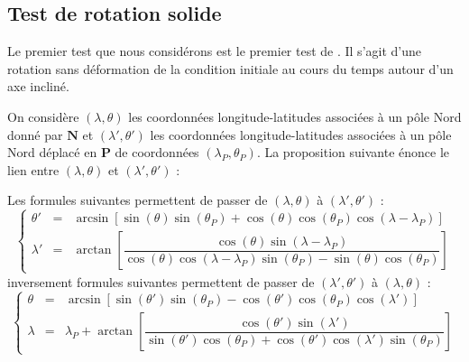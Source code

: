 \subsection{Test de rotation solide}

Le premier test que nous considérons est le premier test de \cite{Williamson1992}. Il s'agit d'une rotation sans déformation de la condition initiale au cours du temps autour d'un axe incliné.

On considère $(\lambda, \theta)$ les coordonnées longitude-latitudes associées à un pôle Nord donné par $\mathbf{N}$ et $(\lambda', \theta')$ les coordonnées longitude-latitudes associées à un pôle Nord déplacé en $\mathbf{P}$ de coordonnées $(\lambda_P, \theta_P)$. La proposition suivante énonce le lien entre $(\lambda, \theta)$ et $(\lambda', \theta')$ :

\begin{proposition}
Les formules suivantes permettent de passer de $(\lambda, \theta)$ à $(\lambda', \theta')$ :
\begin{equation}
\label{from classic to prime}
\left\lbrace 
\begin{array}{rcl}
\theta' & = & \arcsin \left[ \sin( \theta) \sin(\theta_P) + \cos( \theta ) \cos( \theta_P) \cos( \lambda - \lambda_P ) \right] \\
\lambda' & = & \arctan \left[ \dfrac{\cos ( \theta) \sin( \lambda - \lambda_P)}{\cos( \theta) \cos( \lambda - \lambda_P) \sin( \theta_P) - \sin( \theta) \cos( \theta_P)} \right]
\end{array}
\right.
\end{equation}
inversement formules suivantes permettent de passer de $(\lambda', \theta')$ à $(\lambda, \theta)$ :
\begin{equation}
\label{from prime to classic}
\left\lbrace 
\begin{array}{rcl}
\theta & = & \arcsin \left[ \sin( \theta') \sin(\theta_P) - \cos( \theta' ) \cos( \theta_P) \cos( \lambda' ) \right] \\
\lambda & = & \lambda_P + \arctan \left[ \dfrac{\cos ( \theta') \sin( \lambda ')}{\sin( \theta') \cos( \theta_P) + \cos ( \theta') \cos( \lambda') \sin ( \theta_P)} \right]
\end{array}
\right.
\end{equation}
\end{proposition}

